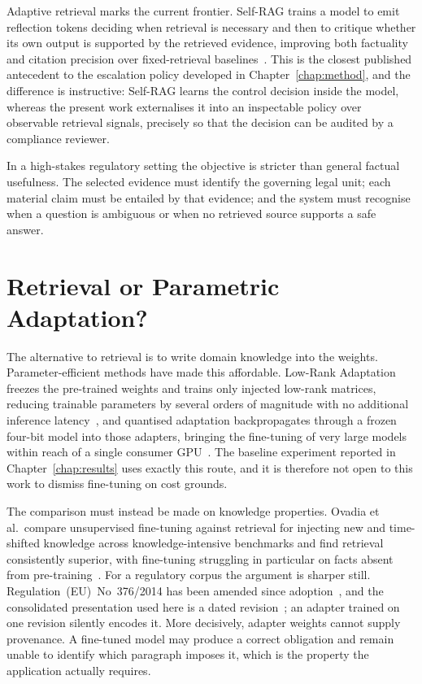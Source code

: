 Adaptive retrieval marks the current frontier. Self-RAG trains a model to emit reflection tokens deciding when retrieval is necessary and then to critique whether its own output is supported by the retrieved evidence, improving both factuality and citation precision over fixed-retrieval baselines~\cite{asai2024selfrag}. This is the closest published antecedent to the escalation policy developed in Chapter~\ref{chap:method}, and the difference is instructive: Self-RAG learns the control decision inside the model, whereas the present work externalises it into an inspectable policy over observable retrieval signals, precisely so that the decision can be audited by a compliance reviewer.

In a high-stakes regulatory setting the objective is stricter than general factual usefulness. The selected evidence must identify the governing legal unit; each material claim must be entailed by that evidence; and the system must recognise when a question is ambiguous or when no retrieved source supports a safe answer.

\section{Retrieval or Parametric Adaptation?}
\label{sec:sota-parametric}

The alternative to retrieval is to write domain knowledge into the weights. Parameter-efficient methods have made this affordable. Low-Rank Adaptation freezes the pre-trained weights and trains only injected low-rank matrices, reducing trainable parameters by several orders of magnitude with no additional inference latency~\cite{hu2022lora}, and quantised adaptation backpropagates through a frozen four-bit model into those adapters, bringing the fine-tuning of very large models within reach of a single consumer \ac{GPU}~\cite{dettmers2023qlora}. The baseline experiment reported in Chapter~\ref{chap:results} uses exactly this route, and it is therefore not open to this work to dismiss fine-tuning on cost grounds.

The comparison must instead be made on knowledge properties. Ovadia et al.\ compare unsupervised fine-tuning against retrieval for injecting new and time-shifted knowledge across knowledge-intensive benchmarks and find retrieval consistently superior, with fine-tuning struggling in particular on facts absent from pre-training~\cite{ovadia2024finetuning}. For a regulatory corpus the argument is sharper still. Regulation~(EU)~No~376/2014 has been amended since adoption~\cite{eu2014reg376}, and the consolidated presentation used here is a dated revision~\cite{easa2022easyaccess376}; an adapter trained on one revision silently encodes it. More decisively, adapter weights cannot supply provenance. A fine-tuned model may produce a correct obligation and remain unable to identify which paragraph imposes it, which is the property the application actually requires.

